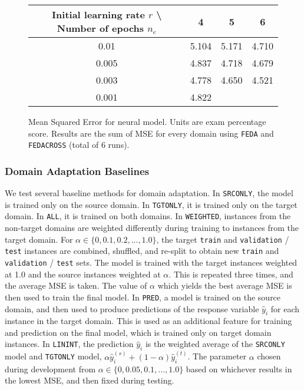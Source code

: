 \documentclass{article}
\begin{document}
\begin{figure}[h]
\centering{}
\label{fig:hypers}
\begin{tabular}{ |c||c|c|c| }
\hline
Initial learning rate \(r\) \textbackslash{} Number of epochs \(n_e\) & 4 & 5 & 6 \\
\hline
0.01 & 5.104 & 5.171 & 4.710 \\
\hline
0.005 & 4.837 & 4.718 & 4.679 \\
\hline
0.003 & 4.778 & 4.650 & 4.521 \\
\hline
0.001 & 4.822 & & \\
\hline
\end{tabular}
\caption{Mean Squared Error for neural model.  Units are exam percentage score. Results are the sum of MSE for every domain using \texttt{FEDA} and \texttt{FEDACROSS} (total of 6 runs).}
\end{figure}

\subsubsection{Domain Adaptation Baselines}

We test several baseline methods for domain adaptation. In \texttt{SRCONLY}, the model is trained only on the source domain. In \texttt{TGTONLY}, it is trained only on the target domain. In \texttt{ALL}, it is trained on both domains. In \texttt{WEIGHTED}, instances from the non-target domains are weighted differently during training to instances from the target domain. For \(\alpha \in \{0, 0.1, 0.2, ..., 1.0\} \), the target \texttt{train} and \texttt{validation} / \texttt{test} instances are combined, shuffled, and re-split to obtain new \texttt{train} and \texttt{validation} / \texttt{test} sets. The model is trained with the target instances weighted at 1.0 and the source instances weighted at \(\alpha\). This is repeated three times, and the average MSE is taken. The value of \(\alpha\) which yields the best average MSE is then used to train the final model. In \texttt{PRED}, a model is trained on the source domain, and then used to produce predictions of the response variable \(\hat{y}_i\) for each instance in the target domain. This is used as an additional feature for training and prediction on the final model, which is trained only on target domain instances. In \texttt{LININT}, the prediction \(\hat{y}_i\) is the weighted average of the \texttt{SRCONLY} model and \texttt{TGTONLY} model, \(\alpha \hat{y}_i^{(s)} + (1 - \alpha)\hat{y}_i^{(t)} \). The parameter \(\alpha\) chosen during development from \(\alpha \in \{0, 0.05, 0.1, ..., 1.0\} \) based on whichever results in the lowest MSE, and then fixed during testing.
\end{document}
